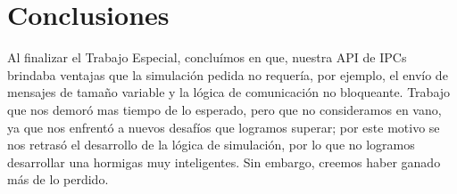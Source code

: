 \documentclass[a4paper,10pt]{article}
\begin{document}
\newpage
\section{Conclusiones}
Al finalizar el Trabajo Especial, concluímos en que, nuestra API de IPCs brindaba ventajas que la simulación pedida no requería, por ejemplo, el envío
de mensajes de tamaño variable y la lógica de comunicación no bloqueante. Trabajo que nos demoró mas tiempo de lo esperado, pero que no consideramos
en vano, ya que nos enfrentó a nuevos desafíos que logramos superar; por este motivo se nos retrasó el desarrollo de la lógica de simulación, por lo que
no logramos desarrollar una hormigas muy inteligentes. Sin embargo, creemos haber ganado más de lo perdido.

\bigskip
\end{document}
